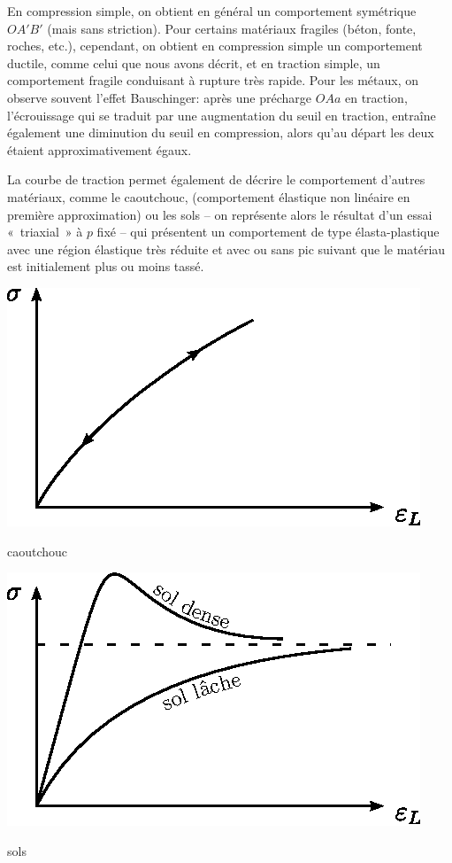 En compression simple, on obtient en général un comportement symétrique $OA'B'$ (mais sans striction).
Pour certains matériaux fragiles (béton, fonte, roches, etc.), cependant, on obtient en compression simple un comportement ductile, comme celui que nous avons décrit, et en traction simple, un comportement fragile conduisant à rupture très rapide.
Pour les métaux, on observe souvent l'effet Bauschinger: après une précharge $OAa$ en traction, l'écrouissage qui se traduit par une augmentation du seuil en traction, entraîne également une diminution du seuil en compression, alors qu'au départ les deux étaient approximativement égaux.

La courbe de traction permet également de décrire le comportement d'autres matériaux, comme le caoutchouc, (comportement élastique non linéaire en première approximation) ou les sols -- on représente alors le résultat d'un essai «~triaxial~» à $p$ fixé -- qui présentent un comportement de type élasta-plastique avec une région élastique très réduite et avec ou sans pic suivant que le matériau est initialement plus ou moins tassé.
\begin{multicols}{2}
    \begin{center}
        \includegraphics{../images/T1_Ch04-0015}

        caoutchouc
    \end{center}
    \columnbreak
    \begin{center}
        \includegraphics{../images/T1_Ch04-0016}

        sols
    \end{center}
\end{multicols}

